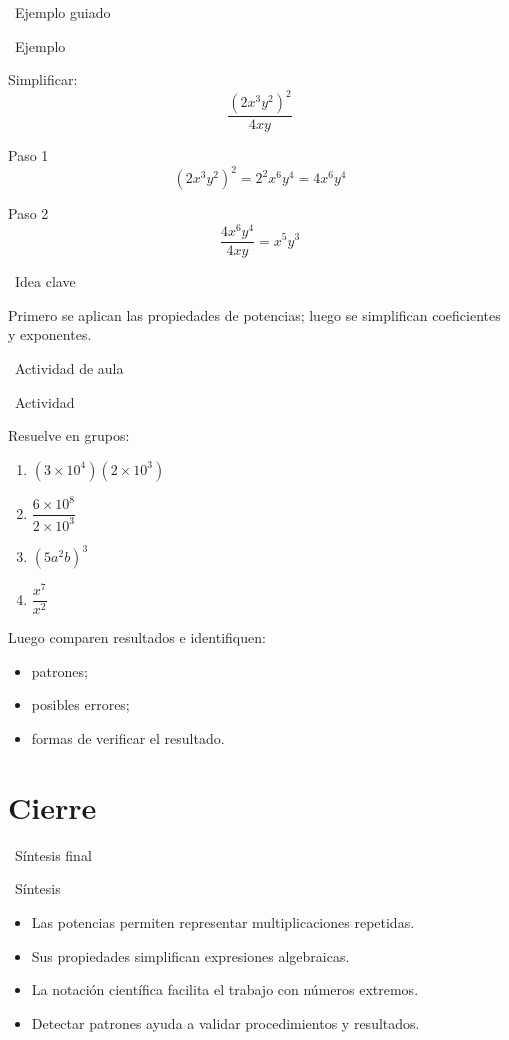 \documentclass[10pt,handout,aspectratio=169]{beamer}
\newcommand{\pp}{\pause}
\newcommand{\IdeaClave}[1]{
	\begin{alertblock}{\faLightbulb\ Idea clave}
		#1
	\end{alertblock}
}
\newcommand{\Ejemplo}[1]{
	\begin{exampleblock}{\faPen\ Ejemplo}
		#1
	\end{exampleblock}
}
\newcommand{\Actividad}[1]{
	\begin{block}{\faUsers\ Actividad}
		#1
	\end{block}
}
\newcommand{\Resumen}[1]{
	\begin{block}{\faClipboardCheck\ Síntesis}
		#1
	\end{block}
}
\begin{document}
	\begin{frame}{\faChalkboardTeacher\ Ejemplo guiado}
		\Ejemplo{
			Simplificar:
			\[
			\dfrac{(2x^3y^2)^2}{4xy}
			\]
		}
		\pp
		
		\begin{block}{Paso 1}
			\[
			(2x^3y^2)^2 = 2^2x^6y^4 = 4x^6y^4
			\]
		\end{block}
		
		\pp
		\begin{block}{Paso 2}
			\[
			\dfrac{4x^6y^4}{4xy}=x^5y^3
			\]
		\end{block}
		
		\pp
		\IdeaClave{
			Primero se aplican las propiedades de potencias; luego se simplifican coeficientes y exponentes.
		}
	\end{frame}
	
	\begin{frame}{\faUsers\ Actividad de aula}
		\Actividad{
			Resuelve en grupos:
			\begin{enumerate}
				\item $\left(3\times 10^4\right)\left(2\times 10^3\right)$
				\item $\dfrac{6\times 10^8}{2\times 10^3}$
				\item $(5a^2b)^3$
				\item $\dfrac{x^7}{x^2}$
			\end{enumerate}
			
			Luego comparen resultados e identifiquen:
			\begin{itemize}
				\item patrones;
				\item posibles errores;
				\item formas de verificar el resultado.
			\end{itemize}
		}
	\end{frame}
	
	\section{Cierre}
	
	\begin{frame}{\faClipboardCheck\ Síntesis final}
		\Resumen{
			\begin{itemize}
				\item Las potencias permiten representar multiplicaciones repetidas.
				\item Sus propiedades simplifican expresiones algebraicas.
				\item La notación científica facilita el trabajo con números extremos.
				\item Detectar patrones ayuda a validar procedimientos y resultados.
			\end{itemize}
		}
	\end{frame}
	
\end{document}
